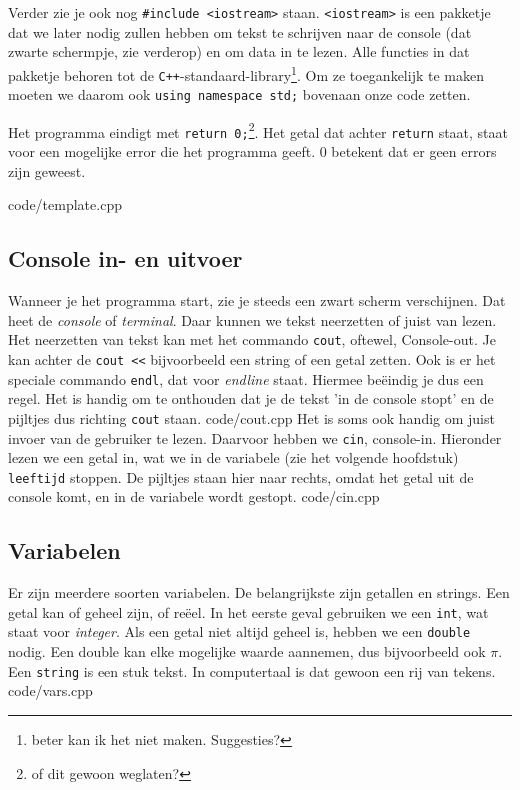 \documentclass[12pt,a4paper]{article}
\newcommand{\code}{}
\newcommand{\icode}{\lstinline}
\newcommand{\mono}{\texttt}
\newcommand{\cpp}{\mono{C++}}
\begin{document}
Verder zie je ook nog \icode{#include <iostream>} staan. \icode{<iostream>} is een pakketje dat we later nodig zullen hebben om tekst te schrijven naar de console (dat zwarte schermpje, zie verderop) en om data in te lezen. Alle functies in dat pakketje behoren tot de \cpp-standaard-library\footnote{beter kan ik het niet maken. Suggesties?}. Om ze toegankelijk te maken moeten we daarom ook \icode{using namespace std;} bovenaan onze code zetten.


Het programma eindigt met \icode{return 0;}\footnote{of dit gewoon weglaten?}. Het getal dat achter \icode{return} staat, staat voor een mogelijke error die het programma geeft. 0 betekent dat er geen errors zijn geweest.

\code{code/template.cpp}
\subsection{Console in- en uitvoer}
Wanneer je het programma start, zie je steeds een zwart scherm verschijnen. Dat heet de \emph{console} of \emph{terminal}. Daar kunnen we tekst neerzetten of juist van lezen. Het neerzetten van tekst kan met het commando \icode{cout}, oftewel, Console-out. Je kan achter de \icode{cout <<} bijvoorbeeld een string of een getal zetten. Ook is er het speciale commando \icode{endl}, dat voor \emph{endline} staat. Hiermee be\"eindig je dus een regel. Het is handig om te onthouden dat je de tekst 'in de console stopt' en de pijltjes dus richting \icode{cout} staan.
\code{code/cout.cpp}
Het is soms ook handig om juist invoer van de gebruiker te lezen. Daarvoor hebben we \icode{cin}, console-in. Hieronder lezen we een getal in, wat we in de variabele (zie het volgende hoofdstuk) \icode{leeftijd} stoppen. De pijltjes staan hier naar rechts, omdat het getal uit de console komt, en in de variabele wordt gestopt.
\code{code/cin.cpp}
\subsection{Variabelen}
Er zijn meerdere soorten variabelen. De belangrijkste zijn getallen en strings. Een getal kan of geheel zijn, of re\"eel. In het eerste geval gebruiken we een \icode{int}, wat staat voor \emph{integer}. Als een getal niet altijd geheel is, hebben we een \icode{double} nodig. Een double kan elke mogelijke waarde aannemen, dus bijvoorbeeld ook $\pi$.\\
Een \icode{string} is een stuk tekst. In computertaal is dat gewoon een rij van tekens.
\code{code/vars.cpp}
\end{document}
